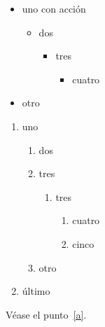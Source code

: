 \documentclass{article}
\begin{document}
\begin{itemize}
\item uno con acción
\begin{itemize}\item dos\begin{itemize}\item tres\begin{itemize}\item cuatro\end{itemize}\end{itemize}\end{itemize}
\item otro
\end{itemize}
\begin{enumerate}
\item uno\label{a}
\begin{enumerate}\item dos\label{b}\item tres\begin{enumerate}\item tres\label{c}\begin{enumerate}\item cuatro\item cinco\label{d}\end{enumerate}\end{enumerate}\item otro\end{enumerate}
\item último
\end{enumerate}
Véase el punto~\ref{a}.
\end{document}
